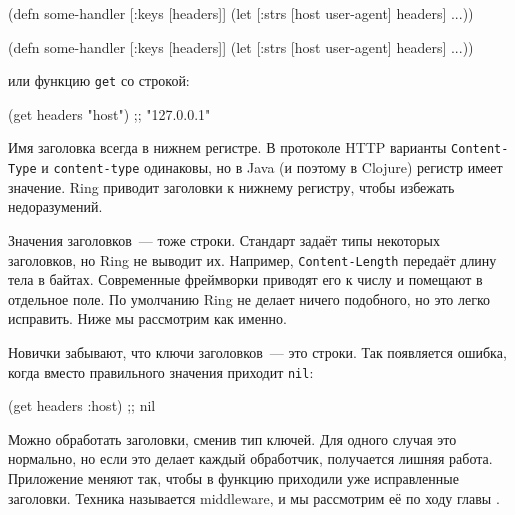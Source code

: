 \ifnarrow

\begin{english}
  \begin{clojure}
(defn some-handler
  [{:keys [headers]}]
  (let [{:strs [host
                user-agent]} headers]
    ...))
  \end{clojure}
\end{english}

\else

\begin{english}
  \begin{clojure}
(defn some-handler
  [{:keys [headers]}]
  (let [{:strs [host user-agent]} headers]
    ...))
  \end{clojure}
\end{english}

\fi

\noindent
или функцию \verb|get| со строкой:

\begin{english}
  \begin{clojure}
(get headers "host") ;; "127.0.0.1"
  \end{clojure}
\end{english}


Имя заголовка всегда в нижнем регистре. В протоколе HTTP варианты
\verb|Content-Type| и \verb|content-type| одинаковы, но в Java (и поэтому в
Clojure) регистр имеет значение. Ring приводит заголовки к нижнему регистру,
чтобы избежать недоразумений.

Значения заголовков~--- тоже строки. Стандарт задаёт типы некоторых заголовков,
но Ring не выводит их. Например, \verb|Content-Length| передаёт длину тела в
байтах. Современные фреймворки приводят его к числу и помещают в отдельное
поле. По умолчанию Ring не делает ничего подобного, но это легко исправить. Ниже
мы рассмотрим как именно.

Новички забывают, что ключи заголовков~--- это строки. Так появляется ошибка, когда
вместо правильного значения приходит \verb|nil|:

\begin{english}
  \begin{clojure}
(get headers :host) ;; nil
  \end{clojure}
\end{english}

Можно обработать заголовки, сменив тип ключей. Для одного случая это нормально,
но если это делает каждый обработчик, получается лишняя работа. Приложение
меняют так, чтобы в функцию приходили уже исправленные заголовки. Техника
называется middleware, и мы рассмотрим её по ходу главы .

